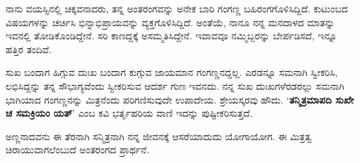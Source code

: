 {ನಾನು ವಯಸ್ಸಿನಲ್ಲಿ ಚಿಕ್ಕವನಾದರು, ತನ್ನ ಅಂತರಂಗವನ್ನು ಅನೇಕ ಬಾರಿ ಗಂಗಣ್ಣ ಬಹಿರಂಗಗೊಳಿಸಿದ್ದಿದೆ. ಕುಟುಂಬದ ವಿಷಯಗಳನ್ನು ಚರ್ಚಿಸಿ ಭಿನ್ನಾಭಿಪ್ರಾಯವನ್ನು ವ್ಯಕ್ತಗೊಳಿಸಿದ್ದಿದೆ. ಅಂತೆಯೆ, ನಾನೂ ನನ್ನ ಮನದಾಳದ ಮಾತನ್ನು ಇವನಲ್ಲಿ ತೋಡಿಕೊಂಡಿದ್ದೇನೆ. ಸರಿ ಕಾಣದ್ದಕ್ಕೆ ಅಸಮ್ಮತಿಸಿದ್ದೇನೆ. ಇವಾವವೂ ನಮ್ಮಿಬ್ಬರನ್ನು ಬೇರ್ಪಡಿಸದೆ, ಇನ್ನೂ ಹತ್ತಿರ ತಂದಿವೆ.

ಸುಖ ಬಂದಾಗ ಹಿಗ್ಗುವ ದುಃಖ ಬಂದಾಗ ಕುಗ್ಗುವ ಜಾಯಮಾನ ಗಂಗಣ್ಣನದ್ದಲ್ಲ. ಎರಡನ್ನೂ ಸಮನಾಗಿ ಸ್ವೀಕರಿಸಿ, ಲಭಿಸಿದ್ದನ್ನು ತನ್ನ ಸೌಭಾಗ್ಯವೆಂದು ಸ್ವೀಕರಿಸುವ ಆದರ್ಶ ಗುಣ ಇವನದು. ನನ್ನ ಸುಖ  \enginline{-}  ದುಃಖಗಳೆರಡರಲ್ಲು ಸಮನಾಗಿ ಭಾಗಿಯಾದ ಗಂಗಣ್ಣನನ್ನು ಮಿತ್ರನೆಂದು ಪರಿಗಣಿಸುವುದೇ ಉಪಾದೇಯ. ಶ್ರೇಯಸ್ಕರವು ಹೌದು. ‘\textbf{ತನ್ಮಿತ್ರಮಾಪದಿ ಸುಖೇ ಚ ಸಮಕ್ರಿಯಂ ಯತ್}’   \enginline{-}   ಎಂಬ ಕವಿ ಭರ್ತೃಹರಿಯ ವಾಣಿ ಇದನ್ನು ಪುಷ್ಟೀಕರಿಸುತ್ತದೆ.

ಅಣ್ಣನಾದವನು ಈ ತೆರನಾಗಿ ಸನ್ಮಿತ್ರನಾಗಿ ನನ್ನ ಜೀವನಕ್ಕೆ ಆಸರೆಯಾದುದು ಯೋಗಾಯೋಗ. ಈ ಮಿತ್ರತ್ವ ಚಿರಾಯುವಾಗಲೆಂಬುದೆ ಅಂತರಂಗದ ಪ್ರಾರ್ಥನೆ.

\articleend
}
